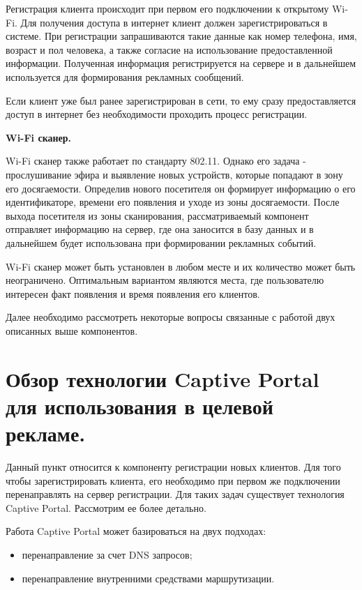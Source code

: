 Регистрация клиента происходит при первом его подключении к открытому Wi-Fi. Для получения доступа в интернет клиент должен зарегистрироваться в системе. При регистрации запрашиваются такие данные как номер телефона, имя, возраст и пол человека, а также согласие на использование предоставленной информации. Полученная информация регистрируется на сервере и в дальнейшем используется для формирования рекламных сообщений.

Если клиент уже был ранее зарегистрирован в сети, то ему сразу предоставляется доступ в интернет без необходимости проходить процесс регистрации.

\textbf{Wi-Fi сканер.}

Wi-Fi сканер также работает по стандарту 802.11. Однако его задача - прослушивание эфира и выявление новых устройств, которые попадают в зону его досягаемости. Определив нового посетителя он формирует информацию о его идентификаторе, времени его появления и уходе из зоны досягаемости. После выхода посетителя из зоны сканирования, рассматриваемый компонент отправляет информацию на сервер, где она заносится в базу данных и в дальнейшем будет использована при формировании рекламных событий.

Wi-Fi сканер может быть установлен в любом месте и их количество может быть неограничено. Оптимальным вариантом являются места, где пользователю интересен факт появления и время появления его клиентов.

Далее необходимо рассмотреть некоторые вопросы связанные с работой двух описанных выше компонентов.

\section{Обзор технологии Captive Portal для использования в целевой рекламе.}

Данный пункт относится к компоненту регистрации новых клиентов. Для того чтобы зарегистрировать клиента, его необходимо при первом же подключении перенаправлять на сервер регистрации. Для таких задач существует технология Captive Portal. Рассмотрим ее более детально.

Работа Captive Portal может базироваться на двух подходах:

\begin{itemize}
	\item перенаправление за счет DNS запросов;
	\item перенаправление внутренними средствами маршрутизации.
\end{itemize}

